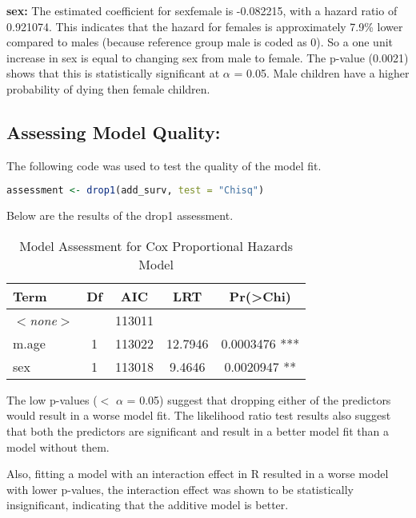 \documentclass[12pt,letterpaper]{article}
\begin{document}
\vspace{1cm}

\textbf{sex:} The estimated coefficient for sexfemale is -0.082215, with a hazard ratio of 0.921074. This indicates that the hazard for females is approximately 7.9\% lower compared to males (because reference group male is coded as 0). So a one unit increase in sex is equal to changing sex from male to female. The p-value (0.0021) shows that this is statistically significant at $\alpha$ = 0.05. Male children have a higher probability of dying then female children.

\vspace{2cm}

\subsection*{Assessing Model Quality:}

The following code was used to test the quality of the model fit.

\begin{lstlisting}[language = R]
	assessment <- drop1(add_surv, test = "Chisq")
\end{lstlisting}

Below are the results of the drop1 assessment.

\begin{table}[ht]
	\centering
	\caption{Model Assessment for Cox Proportional Hazards Model}
	\label{tab:model_assessment}
	\begin{tabular}{lcccc}
		\toprule
		Term & Df & AIC & LRT & Pr(>Chi) \\ 
		\midrule
		\textit{$<$none$>$} &  & 113011 &  &  \\
		m.age & 1 & 113022 & 12.7946 & 0.0003476 *** \\
		sex & 1 & 113018 & 9.4646 & 0.0020947 ** \\
		\bottomrule
	\end{tabular}
\end{table}

The low p-values ($<$ $\alpha$ = 0.05) suggest that dropping either of the predictors would result in a worse model fit. The likelihood ratio test results also suggest that both the predictors are significant and result in a better model fit than a model without them.

Also, fitting a model with an interaction effect in R resulted in a worse model with lower p-values, the interaction effect was shown to be statistically insignificant, indicating that the additive model is better.
\end{document}
